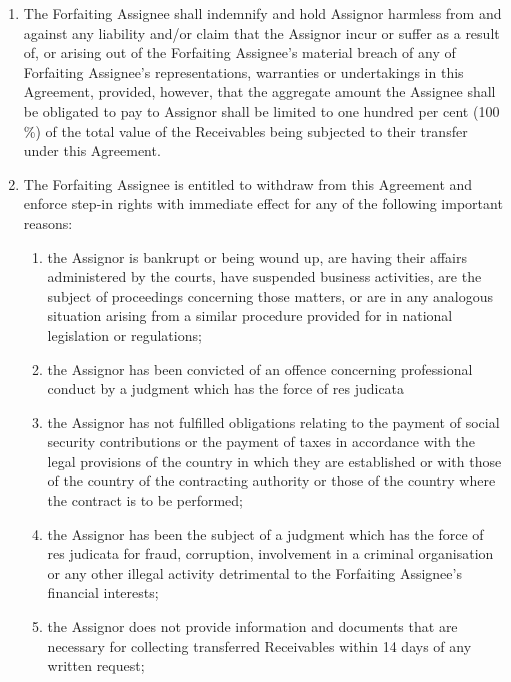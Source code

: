 \documentclass[a4paper]{article}
\begin{document}
\begin{multicols}{2}
\begin{enumerate}
  \item{The Forfaiting Assignee shall indemnify and hold Assignor
      harmless from and against any liability and/or claim that the
      Assignor incur or suffer as a result of, or arising out of the
      Forfaiting Assignee’s material breach of any of Forfaiting
      Assignee’s representations, warranties or undertakings in this
      Agreement, provided, however, that the aggregate amount the
      Assignee shall be obligated to pay to Assignor shall be limited
      to one hundred per cent (100 \%) of the total value of the
      Receivables being subjected to their transfer under this
      Agreement.}

  \item{The Forfaiting Assignee is entitled to withdraw from this
      Agreement and enforce step{-}in rights with immediate effect for
      any of the following important reasons:}

    \begin{enumerate}
    \item{the Assignor is bankrupt or being wound up, are having their
        affairs administered by the courts, have suspended business
        activities, are the subject of proceedings concerning those
        matters, or are in any analogous situation arising from a
        similar procedure provided for in national legislation or
        regulations;}

    \item{the Assignor has been convicted of an offence concerning
        professional conduct by a judgment which has the force of res
        judicata}

    \item{the Assignor has not fulfilled obligations relating to the
        payment of social security contributions or the payment of
        taxes in accordance with the legal provisions of the country
        in which they are established or with those of the country of
        the contracting authority or those of the country where the
        contract is to be performed;}

    \item{the Assignor has been the subject of a judgment which has
        the force of res judicata for fraud, corruption, involvement
        in a criminal organisation or any other illegal activity
        detrimental to the Forfaiting Assignee’s financial
        interests;}

    \item{the Assignor does not provide information and documents that
        are necessary for collecting transferred Receivables within 14
        days of any written request;}


\end{enumerate}
\end{enumerate}
\end{multicols}
\end{document}
